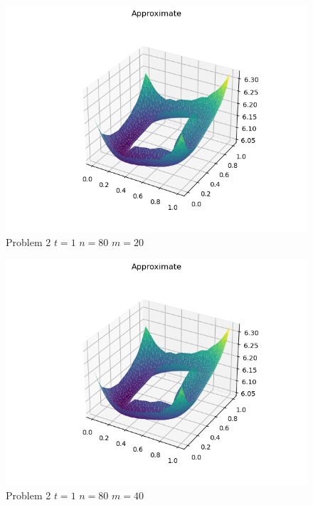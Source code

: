 \documentclass{report}
\begin{document}
\begin{figure}[h]
	\caption{Problem 2 $t = 1$ $n = 80$ $m = 20$}
	\includegraphics[width=\textwidth]{example.png}
\end{figure}
\begin{figure}[h]
	\caption{Problem 2 $t = 1$ $n = 80$ $m = 40$}
	\includegraphics[width=\textwidth]{example.png}
\end{figure}
\end{document}
